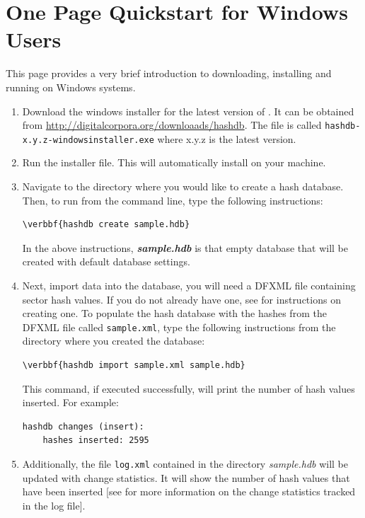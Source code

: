 \documentclass[11pt,fleqn]{article} %
\begin{document}
\section*{One Page Quickstart for Windows Users}
 This page provides a very brief introduction to downloading, installing and running \hash on Windows systems. 
\begin{enumerate}
\item Download the windows installer for the latest version of \hash. It can be obtained from \url{http://digitalcorpora.org/downloaads/hashdb}. The file is called \texttt{hashdb-x.y.z-windowsinstaller.exe} where x.y.z is the latest version. 

\item Run the installer file. This will automatically install \hash on your machine.

\item Navigate to the directory where you would like to create a hash database. Then, to run \hash from the command line, type the following instructions: 
\begin{Verbatim}[commandchars=\\\{\}]
\verbbf{hashdb create sample.hdb}
\end{Verbatim} 

In the above instructions, \textit{\textbf{sample.hdb}} is that empty database that will be created with default database settings.

\item Next, import data into the database, you will need a DFXML file containing sector hash values. If you do not already have one, see \textbf{} for instructions on creating one. To populate the hash database with the hashes from the DFXML file called \texttt{sample.xml}, type the following instructions from the directory where you created the database:
\begin{Verbatim}[commandchars=\\\{\}]
\verbbf{hashdb import sample.xml sample.hdb}
\end{Verbatim} 
This command, if executed successfully, will print the number of hash values inserted. For example: 
\begingroup
\footnotesize
\begin{Verbatim}[fontfamily=courier]
hashdb changes (insert):
    hashes inserted: 2595
\end{Verbatim}
\endgroup
\item Additionally, the file \texttt{log.xml} contained in the directory \textit{sample.hdb} will be updated with change statistics. It will show the number of hash values that have been inserted [see \textbf{} for more information on the change statistics tracked in the log file].
 

\end{enumerate}
\end{document}
